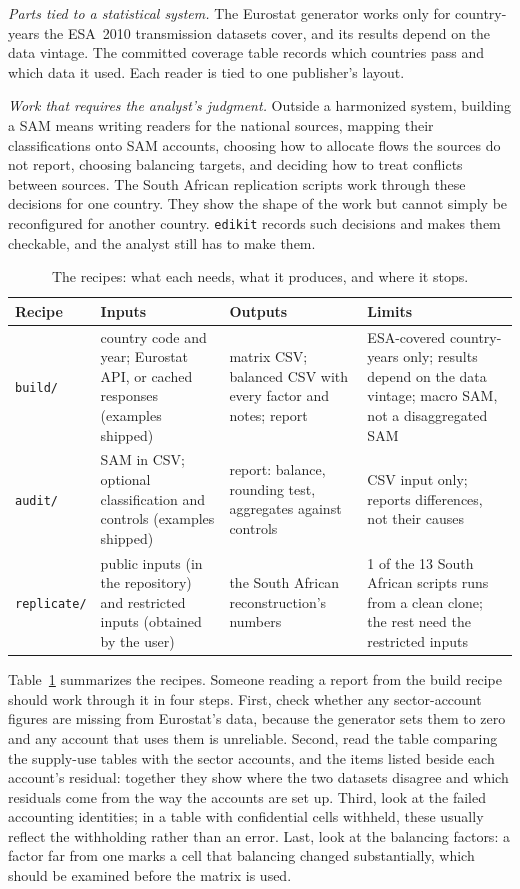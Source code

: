 \documentclass[11pt,a4paper]{article}
\begin{document}
\emph{Parts tied to a statistical system.} The Eurostat generator works
only for country-years the ESA~2010 transmission datasets cover, and its
results depend on the data vintage. The committed coverage table records
which countries pass and which data it used. Each reader is tied to one
publisher's layout.

\emph{Work that requires the analyst's judgment.} Outside a harmonized system,
building a SAM means writing readers for the national sources, mapping
their classifications onto SAM accounts, choosing how to allocate flows
the sources do not report, choosing balancing targets, and deciding how to
treat conflicts between sources. The South African replication scripts
work through these decisions for one country. They show the shape of the
work but cannot simply be reconfigured for another country.
\texttt{edikit} records such decisions and makes them checkable, and the
analyst still has to make them.

\begin{table}[t]
\centering\small
\begin{tabularx}{\textwidth}{>{\raggedright\arraybackslash}p{}>{\raggedright\arraybackslash}p{}>{\raggedright\arraybackslash}p{}X}
\toprule
Recipe & Inputs & Outputs & Limits \\
\midrule
\texttt{build/} & country code and year; Eurostat API, or cached responses (examples shipped) & matrix CSV; balanced CSV with every factor and notes; report & ESA-covered country-years only; results depend on the data vintage; macro SAM, not a disaggregated SAM \\
\texttt{audit/} & SAM in CSV; optional classification and controls (examples shipped) & report: balance, rounding test, aggregates against controls & CSV input only; reports differences, not their causes \\
\texttt{replicate/} & public inputs (in the repository) and restricted inputs (obtained by the user) & the South African reconstruction's numbers & 1 of the 13 South African scripts runs from a clean clone; the rest need the restricted inputs \\
\bottomrule
\end{tabularx}
\caption{The recipes: what each needs, what it produces, and where it
stops.}
\label{tab:recipes}
\end{table}

Table~\ref{tab:recipes} summarizes the recipes. Someone reading a report
from the build recipe should work through it in four steps. First, check
whether any sector-account figures are missing from Eurostat's data,
because the generator sets them to zero and any account that uses them is
unreliable. Second, read the table comparing the supply-use tables with
the sector accounts, and the items listed beside each account's residual:
together they show where the two datasets disagree and which residuals
come from the way the accounts are set up. Third, look at the failed
accounting identities; in a table with confidential cells withheld, these
usually reflect the withholding rather than an error. Last, look at the
balancing factors: a factor far from one marks a cell that balancing
changed substantially, which should be examined before the matrix is
used.
\end{document}
